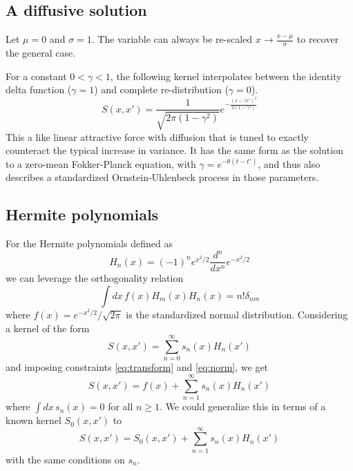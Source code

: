\documentclass{article}
\begin{document}
\subsection{A diffusive solution}
Let $\mu = 0$ and $\sigma = 1$. The variable can always be re-scaled $x
	\rightarrow \frac{x-\mu}{\sigma}$ to recover the general case.

For a constant $0 < \gamma < 1$, the following kernel interpolates between the
identity delta function ($\gamma = 1$) and complete re-distribution ($\gamma =
	0$).
\begin{equation}
	S(x, x') = \frac{1}{\sqrt{2\pi(1-\gamma^2)}} e^{-\frac{(x-\gamma x')^2}{2(1-\gamma^2)}}
	\label{eq:std_norm_k1}
\end{equation}
This a like linear attractive force with diffusion that is tuned to exactly
counteract the typical increase in variance. It has the same form as the
solution to a zero-mean Fokker-Planck equation, with $\gamma =
e^{-\theta(t-t')}$, and thus also describes a standardized Ornstein-Uhlenbeck
process in those parameters.

\subsection{Hermite polynomials}

For the Hermite polynomials defined as
\begin{equation}
  H_n (x) = (-1)^n e^{x^2/2} \frac{d^n}{dx^n} e^{-x^2/2}
  \label{eq:hermite_def}
\end{equation}
we can leverage the orthogonality relation
\begin{equation}
  \int dx \, f(x) H_m(x) H_n(x) = n! \delta_{nm}
  \label{eq:hermite_orth}
\end{equation}
where $f(x) = e^{-x^2/2} / \sqrt{2\pi}$ is the standardized normal distribution. Considering a kernel of the form
\begin{equation}
  S(x, x') = \sum_{n=0}^{\infty} s_n(x) H_n(x')
\end{equation}
and imposing constraints \ref{eq:transform} and \ref{eq:norm}, we get
\begin{equation}
  S(x, x') = f(x) + \sum_{n=1}^{\infty} s_n(x) H_n(x')
  \label{eq:hermite_kernel_f}
\end{equation}
where $\int dx \, s_n(x) = 0$ for all $n \geq 1$. We could generalize this in
terms of a known kernel $S_0(x, x')$ to \begin{equation}
  S(x, x') = S_0(x, x') + \sum_{n=1}^{\infty} s_n(x) H_n(x')
  \label{eq:hermite_kernel}
\end{equation}
with the same conditions on $s_n$.
\end{document}
